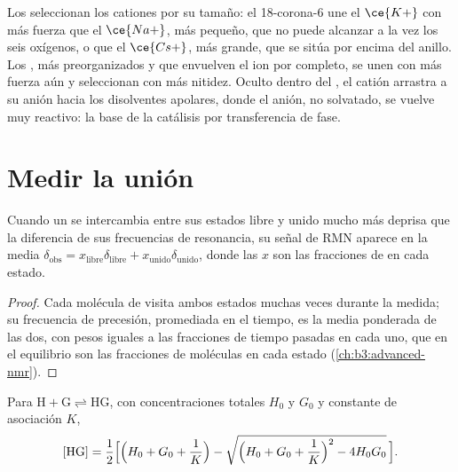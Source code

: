 Los  seleccionan los cationes por su tamaño: el 18-corona-6 une el $\ce{K+}$ con más fuerza que el
$\ce{Na+}$, más pequeño, que no puede alcanzar a la vez los seis oxígenos, o que el $\ce{Cs+}$, más grande, que
se sitúa por encima del anillo. Los , más preorganizados y que envuelven el ion
por completo, se unen con más fuerza aún y seleccionan con más nitidez. Oculto dentro
del , el catión arrastra a su anión hacia los disolventes apolares, donde el anión,
no solvatado, se vuelve muy reactivo: la base de la catálisis por transferencia de fase.

\section{Medir la unión}

\begin{proposition}\label{prop:b3:supramolecular:fast-exchange}
Cuando un  se intercambia entre sus estados libre y unido mucho más deprisa que la
diferencia de sus frecuencias de resonancia, su señal de RMN aparece en la media
$\delta_{\mathrm{obs}} = x_{\mathrm{libre}}\delta_{\mathrm{libre}} + x_{\mathrm{unido}}\delta_{\mathrm{unido}}$, donde las $x$ son las fracciones de  en cada estado.
\end{proposition}

\begin{proof}
Cada molécula de  visita ambos estados muchas veces durante la medida; su
frecuencia de precesión, promediada en el tiempo, es la media ponderada de las dos, con
pesos iguales a las fracciones de tiempo pasadas en cada uno, que en el equilibrio son las
fracciones de moléculas en cada estado (\cref{ch:b3:advanced-nmr}).
\end{proof}

\begin{theorem}\label{thm:b3:supramolecular:isotherm}
Para $\mathrm{H + G \rightleftharpoons HG}$, con concentraciones totales $H_0$ y $G_0$ y constante de asociación $K$,
\[
  [\mathrm{HG}] = \frac{1}{2}\Bigl[\Bigl(H_0 + G_0 + \frac1K\Bigr) - \sqrt{\Bigl(H_0 + G_0 + \frac1K\Bigr)^2 - 4H_0G_0}\,\Bigr].
\]
\end{theorem}

